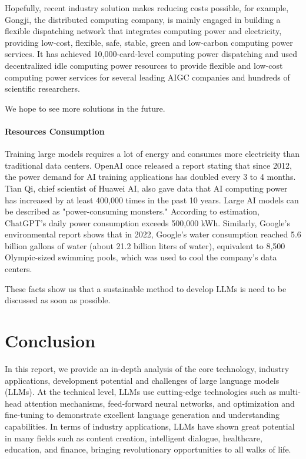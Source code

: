 \documentclass[fleqn,10pt]{SelfArx} %
\begin{document}
Hopefully, recent industry solution makes reducing costs possible, for example\cite{reducecost}, Gongji, the distributed computing company, is mainly engaged in building a flexible dispatching network that integrates computing power and electricity, providing low-cost, flexible, safe, stable, green and low-carbon computing power services. It has achieved 10,000-card-level computing power dispatching and used decentralized idle computing power resources to provide flexible and low-cost computing power services for several leading AIGC companies and hundreds of scientific researchers.

We hope to see more solutions in the future.

\paragraph{Resources Consumption} Training large models requires a lot of energy and consumes more electricity than traditional data centers. OpenAI once released a report stating that since 2012, the power demand for AI training applications has doubled every 3 to 4 months. Tian Qi, chief scientist of Huawei AI, also gave data that AI computing power has increased by at least 400,000 times in the past 10 years. Large AI models can be described as "power-consuming monsters." According to estimation, ChatGPT's daily power consumption exceeds 500,000 kWh. Similarly, Google's environmental report\cite{googlereport} shows that in 2022, Google's water consumption reached 5.6 billion gallons of water (about 21.2 billion liters of water), equivalent to 8,500 Olympic-sized swimming pools, which was used to cool the company's data centers.

These facts show us that a sustainable method to develop LLMs is need to be discussed as soon as possible.



\section{Conclusion}

In this report, we provide an in-depth analysis of the core technology, industry applications, development potential and challenges of large language models (LLMs). At the technical level, LLMs use cutting-edge technologies such as multi-head attention mechanisms, feed-forward neural networks, and optimization and fine-tuning to demonstrate excellent language generation and understanding capabilities. In terms of industry applications, LLMs have shown great potential in many fields such as content creation, intelligent dialogue, healthcare, education, and finance, bringing revolutionary opportunities to all walks of life.
\end{document}
